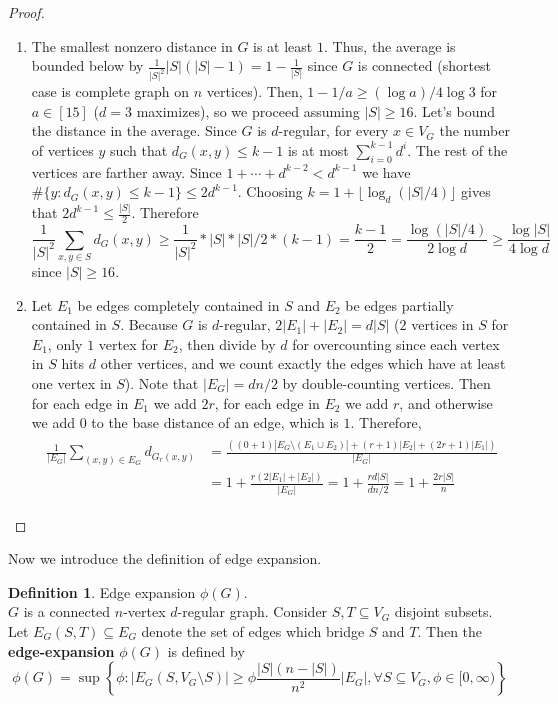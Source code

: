 \documentclass[10pt]{article}
\theoremstyle{definition}
\newtheorem{definition}[theorem]{Definition}
\theoremstyle{definition}
\theoremstyle{definition}
\theoremstyle{definition}
\begin{document}
\begin{proof}

\begin{enumerate}
\item The smallest nonzero distance in $G$ is at least $1$. Thus, the average is bounded below by $\frac{1}{|S|^2}|S|(|S| - 1) = 1 - \frac{1}{|S|}$ since $G$ is connected (shortest case is complete graph on $n$ vertices). Then, $1 - 1/a \geq (\log a)/4 \log 3$ for $a \in [15]$ ($d = 3$ maximizes), so we proceed assuming $|S| \geq 16$. Let's bound the distance in the average. Since $G$ is $d$-regular, for every $x \in V_G$ the number of vertices $y$ such that $d_G(x, y) \leq k -1$ is at most $\sum_{i = 0}^{k - 1} d^i$. The rest of the vertices are farther away. Since $1 + \cdots + d^{k - 2} < d^{k -1}$ we have $\#\{y: d_G(x, y) \leq k - 1\} \leq 2d^{k - 1}$. Choosing $k = 1 + \lfloor \log_d(|S|/4) \rfloor$ gives that $2d^{k - 1} \leq \frac{|S|}{2}$. Therefore
\[
\frac{1}{|S|^2}\sum_{x, y \in S}d_G(x, y) \geq \frac{1}{|S|^2} * |S| * |S|/2 * (k - 1) = \frac{k -1}{2} = \frac{\log(|S|/4)}{2 \log d} \geq \frac{\log |S|}{4\log d}
\]
since $|S| \geq 16$.

\item Let $E_1$ be edges completely contained in $S$ and $E_2$ be edges partially contained in $S$. Because $G$ is $d$-regular, $2|E_1| + |E_2| = d|S|$ ($2$ vertices in $S$ for $E_1$, only $1$ vertex for $E_2$, then divide by $d$ for overcounting since each vertex in $S$ hits $d$ other vertices, and we count exactly the edges which have at least one vertex in $S$). Note that $|E_G| = dn/2$ by double-counting vertices. Then for each edge in $E_1$ we add $2r$, for each edge in $E_2$ we add $r$, and otherwise we add $0$ to the base distance of an edge, which is $1$. Therefore, 
\begin{align*}
\begin{split}
\frac{1}{|E_G|}\sum_{(x, y ) \in E_G} d_{G_r(x, y)} &= \frac{\left((0 + 1)|E_G \setminus (E_1 \cup E_2)| + (r + 1)|E_2| + (2r + 1)|E_1|\right)}{|E_G|} 
\\
&= 1 + \frac{r(2|E_1| + |E_2|)}{|E_G|} = 1 + \frac{rd|S|}{dn/2} = 1 + \frac{2r|S|}{n}
\end{split}
\end{align*}

\end{enumerate}
\end{proof}

Now we introduce the definition of edge expansion. 

\begin{definition} Edge expansion $\phi(G)$. \\
$G$ is a connected $n$-vertex $d$-regular graph.
Consider $S, T \subseteq V_G$ disjoint subsets. Let $E_G(S, T) \subseteq E_G$ denote the set of edges which bridge $S$ and $T$.
Then the \textbf{edge-expansion} $\phi(G)$ is defined by
\[
\phi(G) = \sup \left\{\phi: |E_G(S, V_G\setminus S)| \geq \phi\frac{|S|(n - |S|)}{n^2}|E_G|, \forall S \subseteq V_G, \phi \in [0, \infty)\right\}
\]
\end{definition}
\end{document}
